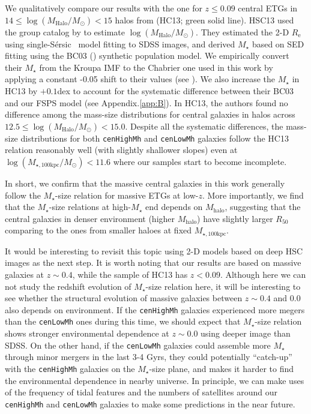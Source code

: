 \documentclass{emulateapj}
\def\ser{{S\'{e}rsic\ }}
\def\rbcg{\texttt{cenHighMh}}
\def\nbcg{\texttt{cenLowMh}}
\def\mstar{{$M_{\star}$}}
\def\mhalo{{$M_{\mathrm{halo}}$}}
\def\logmh{{$\log (M_{\mathrm{Halo}}/M_{\odot})$}}
\def\mtot{{$M_{\star,100\mathrm{kpc}}$}}
\def\logmtot{{$\log (M_{\star,100\mathrm{kpc}}/M_{\odot})$}}
\newcommand{\update}[1]{\textcolor{Bittersweet}{#1}}
\begin{document}
\begin{CJK*}{UTF8}{gbsn}
    We qualitatively compare our results with the one for $z\leq 0.09$ central ETGs in  
    $14\le$\logmh{}$<15$ halos from \citealt{HCompany13} (HC13; green solid line).
    HSC13 used the group catalog by \citet{Yang2007} to estimate \logmh{}. 
    They estimated the 2-D $R_{\mathrm{e}}$ using single-\ser{} model fitting to SDSS 
    images, and derived \mstar{} based on SED fitting using the BC03 (\citealt{BC03}) 
    synthetic population model.
    We empirically convert their \mstar{} from the Kroupa IMF to the Chabrier one 
    used in this work by applying a constant -0.05 shift to their values (see 
    \citealt{Bernardi2016}). 
    We also increase the \mstar{} in HC13 by $+0.1$dex to account for the systematic 
    difference between their BC03 and our FSPS model (see Appendix.\ref{app:B}). 
    In HC13, the authors found no difference among the mass-size distributions for 
    central galaxies in halos across $12.5\le$\logmh{}$<15.0$. 
    Despite all the systematic differences, the mass-size distributions for both \rbcg{} 
    and \nbcg{} galaxies follow the HC13 relation reasonably well (with slightly
    shallower slopes) even at \logmtot{}$< 11.6$ where our samples start to become 
    incomplete. 
    
    In short, we confirm that the massive central galaxies in this work generally 
    follow the \mstar{}-size relation for massive ETGs at low-$z$.
    \update{
    More importantly, we find that the \mstar{}-size relations at high-\mstar{} end 
    depends on \mhalo{}, suggesting that the central galaxies in denser environment 
    (higher \mhalo{}) have slightly larger $R_{\mathrm{50}}$ comparing to the 
    ones from smaller haloes at fixed \mtot{}. 
    }
    
    It would be interesting to revisit this topic using 2-D models based on deep HSC 
    images as the next step.
    It is worth noting that our results are based on massive galaxies at $z\sim 0.4$, 
    while the sample of HC13 has $z<0.09$.
    \update{
    Although here we can not study the redshift evolution of \mstar{}-size relation 
    here, it will be interesting to see whether the structural evolution of massive
    galaxies between $z\sim 0.4$ and $0.0$ also depends on environment. 
    If the \rbcg{} galaxies experienced more megers than the \nbcg{} ones during this 
    time, we should expect that \mstar{}-size relation shows stronger environmental 
    dependence at $z\sim 0.0$ using deeper image than SDSS.} 
    On the other hand, if the \nbcg{} galaxies could assemble more \mstar{} through
    minor mergers in the last 3-4 Gyrs, they could potentially ``catch-up'' with the 
    \rbcg{} galaxies on the \mstar{}-size plane, and makes it harder to find the 
    environmental dependence in nearby universe.
    In principle, we can make uses of the frequency of tidal features and the numbers 
    of satellites around our \rbcg{} and \nbcg{} galaxies to make some predictions 
    in the near future.
    

\end{CJK*}
\end{document}
